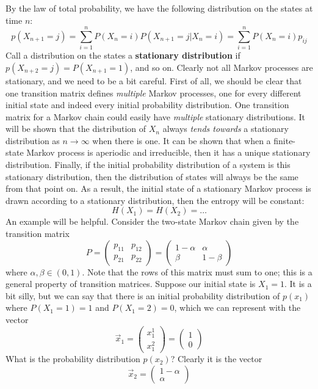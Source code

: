 \documentclass{article}
\theoremstyle{definition}
\theoremstyle{plain}
\begin{document}
By the law of total probability, we have the following distribution on the states at time $n$:
\[ p(X_{n+1} = j) = \sum_{i=1}^n P(X_n = i)P(X_{n+1}=j|X_n = i) = \sum_{i=1}^n P(X_n=i)p_{ij} \]
Call a distribution on the states a \textbf{stationary distribution} if $p(X_{n+2}=j) = P(X_{n+1}=1)$, and so on. Clearly not all Markov processes are stationary, and we need to be a bit careful. First of all, we should be clear that one transition matrix defines \emph{multiple} Markov processes, one for every different initial state and indeed every initial probability distribution. One transition matrix for a Markov chain could easily have \emph{multiple} stationary distributions. It will be shown that the distribution of $X_n$ always \textit{tends towards} a stationary distribution as $n \to \infty$ when there is one. It can be shown that when a finite-state Markov process is aperiodic and irreducible, then it has a unique stationary distribution. Finally, if the initial probability distribution of a system is this stationary distribution, then the distribution of states will always be the same from that point on. As a result, the initial state of a stationary Markov process is drawn according to a stationary distribution, then the entropy will be constant:
\[ H(X_1) = H(X_2) = \ldots \] 
An example will be helpful. Consider the two-state Markov chain given by the transition matrix
\[ P = \begin{pmatrix} p_{11} & p_{12} \\ p_{21} & p_{22} \end{pmatrix} =  \begin{pmatrix} 1-\alpha & \alpha \\
						\beta & 1-\beta \end{pmatrix} \]  
	where $\alpha,\beta \in (0,1)$. Note that the rows of this matrix must sum to one; this is a general property of transition matrices. Suppose our initial state is $X_1 = 1$. It is a bit silly, but we can say that there is an initial probability distribution of $p(x_1)$ where $P(X_1 = 1) = 1$ and $P(X_1 = 2) = 0$, which we can represent with the vector
\[ \vec{x}_1 = \begin{pmatrix} x_1^1 \\ x_1^2 \end{pmatrix} = \begin{pmatrix} 1 \\ 0 \end{pmatrix} \]
What is the probability distribution $p(x_2)$? Clearly it is the vector
\[ \vec{x}_2 = \begin{pmatrix} 1-\alpha \\ \alpha \end{pmatrix} \] 
\end{document}
